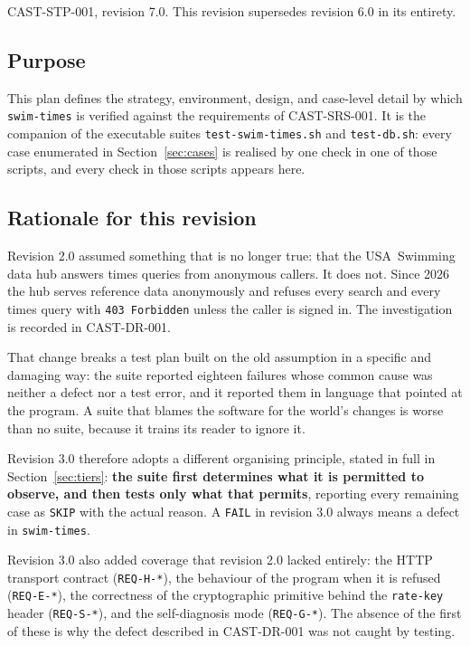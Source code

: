\documentclass[12pt]{article}
\newcommand{\code}[1]{\texttt{#1}}
\newcommand{\req}[1]{\texttt{#1}}
\begin{document}
CAST-STP-001, revision 7.0.  This revision supersedes revision 6.0 in
its entirety.

\subsection{Purpose}

This plan defines the strategy, environment, design, and case-level
detail by which \code{swim-times} is verified against the requirements
of CAST-SRS-001.  It is the companion of the executable suites
\code{test-swim-times.sh} and \code{test-db.sh}: every case enumerated
in Section~\ref{sec:cases} is realised by one check in one of those
scripts, and every check in those scripts appears here.

\subsection{Rationale for this revision}\label{sec:why}

Revision 2.0 assumed something that is no longer true: that the
USA~Swimming data hub answers times queries from anonymous callers.  It
does not.  Since 2026 the hub serves reference data anonymously and
refuses every search and every times query with \code{403 Forbidden}
unless the caller is signed in.  The investigation is recorded in
CAST-DR-001.

That change breaks a test plan built on the old assumption in a
specific and damaging way: the suite reported eighteen failures whose
common cause was neither a defect nor a test error, and it reported
them in language that pointed at the program.  A suite that blames the
software for the world's changes is worse than no suite, because it
trains its reader to ignore it.

Revision 3.0 therefore adopts a different organising principle, stated
in full in Section~\ref{sec:tiers}: \textbf{the suite first determines
what it is permitted to observe, and then tests only what that
permits}, reporting every remaining case as \code{SKIP} with the actual
reason.  A \code{FAIL} in revision 3.0 always means a defect in
\code{swim-times}.

Revision 3.0 also added coverage that revision 2.0 lacked entirely: the
HTTP transport contract (\req{REQ-H-*}), the behaviour of the program
when it is refused (\req{REQ-E-*}), the correctness of the
cryptographic primitive behind the \code{rate-key} header
(\req{REQ-S-*}), and the self-diagnosis mode (\req{REQ-G-*}).  The
absence of the first of these is why the defect described in CAST-DR-001
was not caught by testing.
\end{document}
